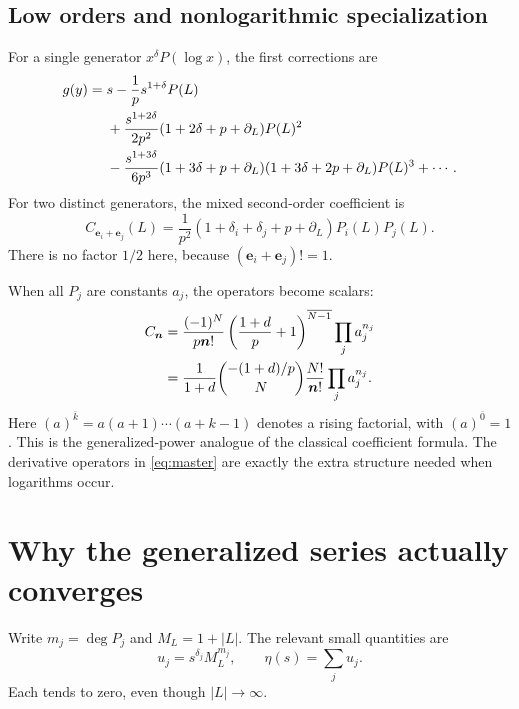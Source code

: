 \documentclass[11pt,a4paper]{article}
\numberwithin{equation}{section}
\theoremstyle{definition}
\newcommand{\DL}{\partial_L}
\newcommand{\nn}{\boldsymbol n}
\newcommand{\ee}{\boldsymbol e}
\newcommand{\rise}[2]{\left(#1\right)^{\overline{#2}}}
\begin{document}
\subsection{Low orders and nonlogarithmic specialization}
For a single generator $x^\delta P(\log x)$, the first corrections are
\begin{align}
 g(y)={}&s-\frac1p s^{1+\delta}P(L)\notag\\
 &+\frac{s^{1+2\delta}}{2p^2}
       (1+2\delta+p+\DL)P(L)^2\notag\\
 &-\frac{s^{1+3\delta}}{6p^3}
       (1+3\delta+p+\DL)(1+3\delta+2p+\DL)P(L)^3+\cdots.
 \label{eq:first-general}
\end{align}
For two distinct generators, the mixed second-order coefficient is
\begin{equation}\label{eq:mixed-second}
 C_{\ee_i+\ee_j}(L)=\frac1{p^2}
   (1+\delta_i+\delta_j+p+\DL)P_i(L)P_j(L).
\end{equation}
There is no factor $1/2$ here, because $(\ee_i+\ee_j)!=1$.

When all $P_j$ are constants $a_j$, the operators become scalars:
\begin{align}
 C_{\nn}
 &=\frac{(-1)^N}{p\nn!}
     \rise{\frac{1+d}{p}+1}{N-1}\prod_j a_j^{n_j}\notag\\
 &=\frac1{1+d}\binom{-(1+d)/p}{N}
      \frac{N!}{\nn!}\prod_j a_j^{n_j}.
 \label{eq:nonlog-master}
\end{align}
Here $(a)^{\overline{k}}=a(a+1)\cdots(a+k-1)$ denotes a rising
factorial, with $(a)^{\overline0}=1$.
This is the generalized-power analogue of the classical coefficient
formula. The derivative operators in \eqref{eq:master} are exactly the
extra structure needed when logarithms occur.

\section{Why the generalized series actually converges}
\label{sec:convergence}

Write $m_j=\deg P_j$ and $M_L=1+|L|$. The relevant small quantities are
\begin{equation}\label{eq:small-variables}
 u_j=s^{\delta_j}M_L^{m_j},\qquad
 \eta(s)=\sum_j u_j.
\end{equation}
Each tends to zero, even though $|L|\to\infty$.
\end{document}
